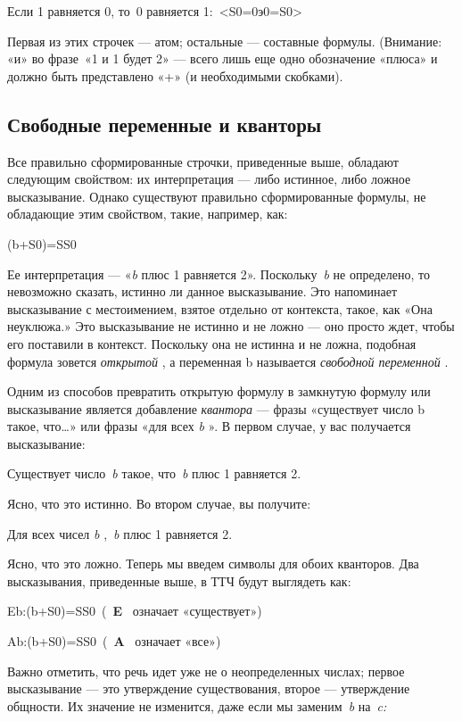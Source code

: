 \documentclass[../main.tex]{subfiles}
\begin{document}
Если 1 равняется 0, то~0 равняется 1:~\textless S0=0э0=S0\textgreater{}

Первая из этих строчек --- атом; остальные --- составные формулы. (Внимание: «и» во фразе~«1 и 1 будет 2» --- всего лишь еще одно обозначение «плюса» и должно быть представлено «+» (и необходимыми скобками).


\subsection{Свободные переменные и кванторы}

Все правильно сформированные строчки, приведенные выше, обладают следующим свойством: их интерпретация --- либо истинное, либо ложное высказывание. Однако существуют правильно сформированные формулы, не обладающие этим свойством, такие, например, как:

(b+S0)=SS0

Ее интерпретация --- «\emph{b} плюс 1 равняется 2». Поскольку~\emph{b} не определено, то невозможно сказать, истинно ли данное высказывание. Это напоминает высказывание с местоимением, взятое отдельно от контекста, такое, как «Она неуклюжа.» Это высказывание не истинно и не ложно --- оно просто ждет, чтобы его поставили в контекст. Поскольку она не истинна и не ложна, подобная формула зовется \emph{открытой} , а переменная b называется \emph{свободной переменной} .

Одним из способов превратить открытую формулу в замкнутую формулу или высказывание является добавление \emph{квантора} --- фразы «существует число b такое, что\ldots» или фразы «для всех \emph{b} ». В первом случае, у вас получается высказывание:

Существует число~\emph{b} такое, что~\emph{b} плюс 1 равняется 2.

Ясно, что это истинно. Во втором случае, вы получите:

Для всех чисел \emph{b} ,~\emph{b} плюс 1 равняется 2.

Ясно, что это ложно. Теперь мы введем символы для обоих кванторов. Два высказывания, приведенные выше, в ТТЧ будут выглядеть как:

Eb:(b+S0)=SS0~(~\textbf{E} ~означает «существует»)

Ab:(b+S0)=SS0~(~\textbf{A} ~означает «все»)

Важно отметить, что речь идет уже не о неопределенных числах; первое высказывание --- это утверждение существования, второе --- утверждение общности. Их значение не изменится, даже если мы заменим~\emph{b} на~\emph{c:}
\end{document}
